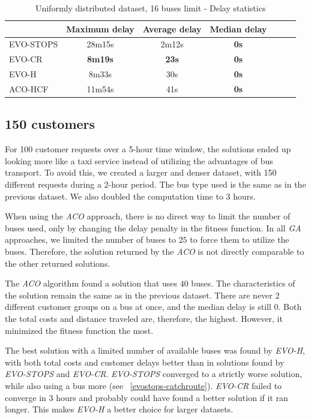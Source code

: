 \begin{table}
    \centering
    \begin{tabular}{lcccccc}
         &  Maximum delay & Average delay & Median delay \\
         \hline
         EVO-STOPS & 28m15s & 2m12s & \textbf{0s} \\
         EVO-CR & \textbf{8m19s} & \textbf{23s} & \textbf{0s} \\
         EVO-H & 8m33s & 30s & \textbf{0s} \\
         ACO-HCF & 11m54s & 41s & \textbf{0s} \\
    \end{tabular}
    \caption{Uniformly distributed dataset, 16 buses limit - Delay statistics}
    \label{tab:exp_random_16_delay_stats}
\end{table}

\clearpage

\subsection{150 customers}

For 100 customer requests over a 5-hour time window, the solutions ended up looking more like a taxi service instead of utilizing the advantages of bus transport. To avoid this, we created a larger and denser dataset, with 150 different requests during a 2-hour period. The bus type used is the same as in the previous dataset. We also doubled the computation time to 3 hours.

When using the \textit{ACO} approach, there is no direct way to limit the number of buses used, only by changing the delay penalty in the fitness function. In all \textit{GA} approaches, we limited the number of buses to $25$ to force them to utilize the buses. Therefore, the solution returned by the \textit{ACO} is not directly comparable to the other returned solutions.

The \textit{ACO} algorithm found a solution that uses $40$ buses. The characteristics of the solution remain the same as in the previous dataset. There are never 2 different customer groups on a bus at once, and the median delay is still 0. Both the total costs and distance traveled are, therefore, the highest. However, it minimized the fitness function the most. 

The best solution with a limited number of available buses was found by \textit{EVO-H}, with both total costs and customer delays better than in solutions found by \textit{EVO-STOPS} and \textit{EVO-CR}. \textit{EVO-STOPS} converged to a strictly worse solution, while also using a bus more (see ~\ref{evostops-catchroute}). \textit{EVO-CR} failed to converge in 3 hours and probably could have found a better solution if it ran longer. This makes \textit{EVO-H} a better choice for larger datasets.

